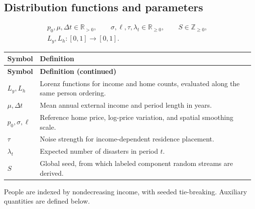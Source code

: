 \documentclass[11pt]{article}
\begin{document}
\subsection{Distribution functions and parameters}
\begin{equation}
\begin{gathered}
 p_0,\mu,\Delta t\in\mathbb{R}_{>0},\qquad
 \sigma,\ell,\tau,\lambda_t\in\mathbb{R}_{\geq0},\qquad S\in\mathbb{Z}_{\geq0},\\
 L_y,L_h:[0,1]\longrightarrow[0,1].
\end{gathered}
\end{equation}
\begin{longtable}{@{}p{}p{}@{}}
\toprule
\textbf{Symbol} & \textbf{Definition} \\
\midrule
\endfirsthead
\toprule
\textbf{Symbol} & \textbf{Definition (continued)} \\
\midrule
\endhead
\bottomrule
\endfoot
$L_y,L_h$ & Lorenz functions for income and home counts, evaluated along the same person ordering. \\
$\mu,\Delta t$ & Mean annual external income and period length in years. \\
$p_0,\sigma,\ell$ & Reference home price, log-price variation, and spatial smoothing scale. \\
$\tau$ & Noise strength for income-dependent residence placement. \\
$\lambda_t$ & Expected number of disasters in period $t$. \\
$S$ & Global seed, from which labeled component random streams are derived. \\
\end{longtable}

People are indexed by nondecreasing income, with seeded tie-breaking. Auxiliary quantities are defined below.
\end{document}
